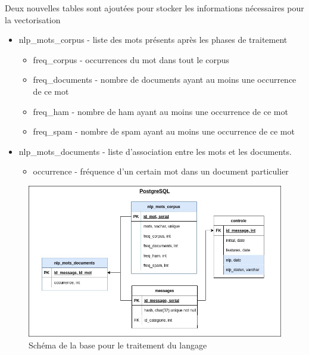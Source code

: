         Deux nouvelles tables sont ajoutées pour stocker les informations nécessaires pour la vectorisation
        \begin{itemize}
            \item nlp\_mots\_corpus - liste des mots présents après les phases de traitement
            \begin{itemize}
                \item freq\_corpus - occurrences du mot dans tout le corpus
                \item freq\_documents - nombre de documents ayant au moins une occurrence de ce mot
                \item freq\_ham - nombre de ham ayant au moins une occurrence de ce mot
                \item freq\_spam - nombre de spam ayant au moins une occurrence de ce mot
            \end{itemize}
            \item nlp\_mots\_documents - liste d'association entre les mots et les documents.
            \begin{itemize}
                \item occurrence - fréquence d'un certain mot dans un document particulier
            \end{itemize}
        \end{itemize}

        \begin{figure}[H]
            \includegraphics[width=\linewidth]{img/nlp_bdd}
            \caption{Schéma de la base pour le traitement du langage}
            \label{fig:nlp_db}
        \end{figure}

